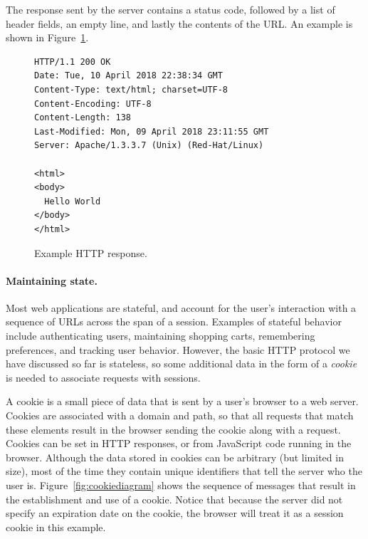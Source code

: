 \documentclass[11pt,twoside]{scrartcl}
\begin{document}
The response sent by the server contains a status code, followed by a list of header fields, an empty line, and lastly the contents of the URL. An example is shown in Figure~\ref{fig:resp-example}.

\begin{figure}
\begin{lstlisting}
HTTP/1.1 200 OK
Date: Tue, 10 April 2018 22:38:34 GMT
Content-Type: text/html; charset=UTF-8
Content-Encoding: UTF-8
Content-Length: 138
Last-Modified: Mon, 09 April 2018 23:11:55 GMT
Server: Apache/1.3.3.7 (Unix) (Red-Hat/Linux)

<html>
<body>
  Hello World
</body>
</html>
\end{lstlisting}
\caption{Example HTTP response.}
\label{fig:resp-example}
\end{figure}

\paragraph{Maintaining state.}

Most web applications are stateful, and account for the user's interaction with a sequence of URLs across the span of a session.
Examples of stateful behavior include authenticating users, maintaining shopping carts, remembering preferences, and tracking user behavior.
However, the basic HTTP protocol we have discussed so far is stateless, so some additional data in the form of a \emph{cookie} is needed to associate requests with sessions.

A cookie is a small piece of data that is sent by a user's browser to a web server. 
Cookies are associated with a domain and path, so that all requests that match these elements result in the browser sending the cookie along with a request. 
Cookies can be set in HTTP responses, or from JavaScript code running in the browser. 
Although the data stored in cookies can be arbitrary (but limited in size), most of the time they contain unique identifiers that tell the server who the user is. 
Figure~\ref{fig:cookiediagram} shows the sequence of messages that result in the establishment and use of a cookie. Notice that because the server did not specify an expiration date on the cookie, the browser will treat it as a session cookie in this example.
\end{document}
